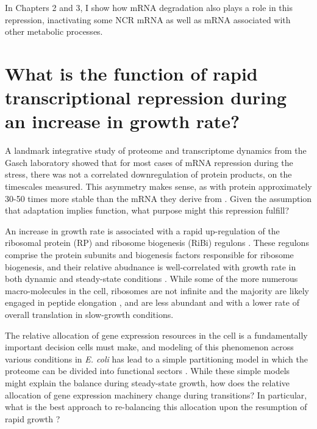 In Chapters 2 and 3, I show how mRNA
degradation also plays a role in this repression, inactivating some
NCR mRNA as well as mRNA associated with other metabolic processes.

\section{What is the function of rapid transcriptional repression
during an increase in growth rate?}

A landmark integrative study of proteome and transcriptome dynamics 
from the Gasch laboratory \parencite{lee2011dynamic} showed that
for most cases of mRNA repression during the stress, there was not
a correlated downregulation of protein products, 
on the timescales measured.
This asymmetry makes sense, as with protein approximately 30-50 times
more stable than the mRNA they derive from 
\parencite{christiano2014global}. 
Given the assumption that adaptation implies function, what purpose
might this repression fulfill?

An increase in growth rate is associated with a rapid
up-regulation of the ribosomal protein (RP)
and ribosome biogenesis (RiBi) regulons
\parencite{griffioen1996ribosomal,jorgensen2004dynamic}. 
These regulons comprise the protein subunits and biogenesis factors
responsible for ribosome biogenesis, and their relative abudnance 
is well-correlated with 
growth rate in both dynamic and steady-state conditions 
\parencite{brauer2008coordination,airoldi2009predicting}.
While some of the more numerous macro-molecules in the cell, 
ribosomes are not infinite and the majority are likely engaged in 
peptide elongation
\parencite{shah2013rate,von2008quantitative,boehlke1975cellular},
and are less abundant 
\parencite{kief1981coordinate,powers1999regulation}
and with a lower rate of overall translation
\parencite{waldron1977evidence}
in slow-growth conditions.

The relative allocation of gene expression resources in the cell is a
fundamentally important decision cells must make, and modeling
of this phenomenon across various conditions in \textit{E. coli} has
lead to a simple partitioning model in which the proteome can be
divided into functional sectors
\parencite{scott2010interdependence,scott2014emergence}.
While these simple models might explain the balance during
steady-state growth, how does the relative allocation of gene
expression machinery change during transitions?
In particular, what is the best approach to re-balancing this
allocation upon the resumption of rapid growth
\parencite{erickson2017global}?

